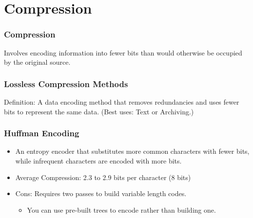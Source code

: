 \documentclass{beamer}
\begin{document}
\section{Compression}
\begin{frame}
   \frametitle{Compression}
   Involves encoding information into fewer bits than would otherwise be occupied by the original source.
\end{frame}

\begin{frame}
   \frametitle{Lossless Compression Methods}
   Definition: A data encoding method that removes redundancies and uses fewer bits to represent the same data. (Best uses: Text or Archiving.)
\end{frame}

\begin{frame}
   \frametitle{Huffman Encoding}
   \begin{itemize}
   \item{An entropy encoder that substitutes more common characters with fewer bits, while infrequent characters are encoded with more bits.}
   \pause
   \item{Average Compression: 2.3 to 2.9 bits per character (8 bits)}
   \item{Cons: Requires two passes to build variable length codes.}
      \begin{itemize}
      \item{You can use pre-built trees to encode rather than building one.}
      \end{itemize}
   \end{itemize}
\end{frame}
\end{document}
